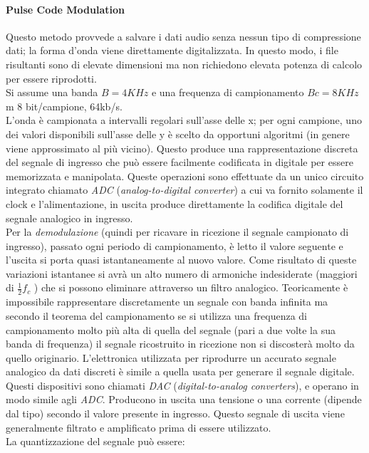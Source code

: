 \paragraph{Pulse Code Modulation}
Questo metodo provvede a salvare i dati audio senza nessun tipo di compressione dati; la forma d'onda viene direttamente digitalizzata. In questo modo, i file risultanti sono di elevate dimensioni ma non richiedono elevata potenza di calcolo per essere riprodotti.\\
Si assume una banda  $ B = 4KHz $ e una frequenza di campionamento $ Bc=8KHz $m 8 bit/campione, 64kb/s.\\
L'onda è campionata a intervalli regolari sull'asse delle x; per ogni campione, uno dei valori disponibili sull'asse delle y è scelto da opportuni algoritmi (in genere viene approssimato al più vicino). Questo produce una rappresentazione discreta del segnale di ingresso che può essere facilmente codificata in digitale per essere memorizzata e manipolata. Queste operazioni sono effettuate da un unico circuito integrato chiamato \textit{ADC} (\textit{analog-to-digital converter}) a cui va fornito solamente il clock e l'alimentazione, in uscita produce direttamente la codifica digitale del segnale analogico in ingresso.\\ 
Per la \textit{demodulazione} (quindi per ricavare in ricezione il segnale campionato di ingresso), passato ogni periodo di campionamento, è letto il valore seguente e l'uscita si porta quasi istantaneamente al nuovo valore. Come risultato di queste variazioni istantanee si avrà un alto numero di armoniche indesiderate (maggiori di $ \frac{1}{2} f_c $ ) che si possono eliminare attraverso un filtro analogico. Teoricamente è impossibile rappresentare discretamente un segnale con banda infinita ma secondo il teorema del campionamento se si utilizza una frequenza di campionamento molto più alta di quella del segnale (pari a due volte la sua banda di frequenza) il segnale ricostruito in ricezione non si discosterà molto da quello originario. L'elettronica utilizzata per riprodurre un accurato segnale analogico da dati discreti è simile a quella usata per generare il segnale digitale. Questi dispositivi sono chiamati \textit{DAC} (\textit{digital-to-analog converters}), e operano in modo simile agli \textit{ADC}. Producono in uscita una tensione o una corrente (dipende dal tipo) secondo il valore presente in ingresso. Questo segnale di uscita viene generalmente filtrato e amplificato prima di essere utilizzato.\\
La quantizzazione del segnale può essere:
